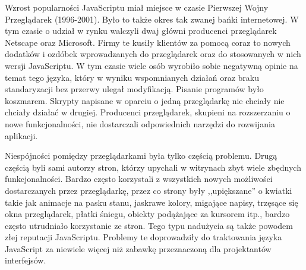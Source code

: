 Wzrost popularności JavaScriptu miał miejsce w czasie Pierwszej Wojny Przeglądarek (1996-2001)\cite{stefanov10}. Było to także okres tak zwanej bańki internetowej. W tym czasie o udział w rynku walczyli dwaj główni producenci przeglądarek Netscape oraz Microsoft. Firmy te kusiły klientów za pomocą coraz to nowych dodatków i ozdóbek wprowadzanych do przeglądarek oraz do stosowanych w nich wersji JavaScriptu. W tym czasie wiele osób wyrobiło sobie negatywną opinie na temat tego języka, który w wyniku wspomnianych działań oraz braku standaryzacji bez przerwy ulegał modyfikacją. Pisanie programów było koszmarem. Skrypty napisane w oparciu o jedną przeglądarkę nie chciały nie chciały działać w drugiej. Producenci przeglądarek, skupieni na rozszerzaniu o nowe funkcjonalności, nie dostarczali odpowiednich narzędzi do rozwijania aplikacji\cite{stefanov10}.

Niespójności pomiędzy przeglądarkami była tylko częścią problemu. Drugą częścią byli sami autorzy stron, którzy upychali w witrynach zbyt wiele zbędnych funkcjonalności. Bardzo często korzystali z wszystkich nowych możliwości dostarczanych przez przeglądarkę, przez co strony były ,,upiększane'' o kwiatki takie jak animacje na pasku stanu, jaskrawe kolory, migające napisy, trzęsące się okna przeglądarek, płatki śniegu, obiekty podążające za kursorem itp., bardzo często utrudniało korzystanie ze stron. Tego typu nadużycia są także powodem złej reputacji JavaScriptu. Problemy te doprowadziły do traktowania języka JavaScript za niewiele więcej niż zabawkę przeznaczoną dla projektantów interfejsów. 


